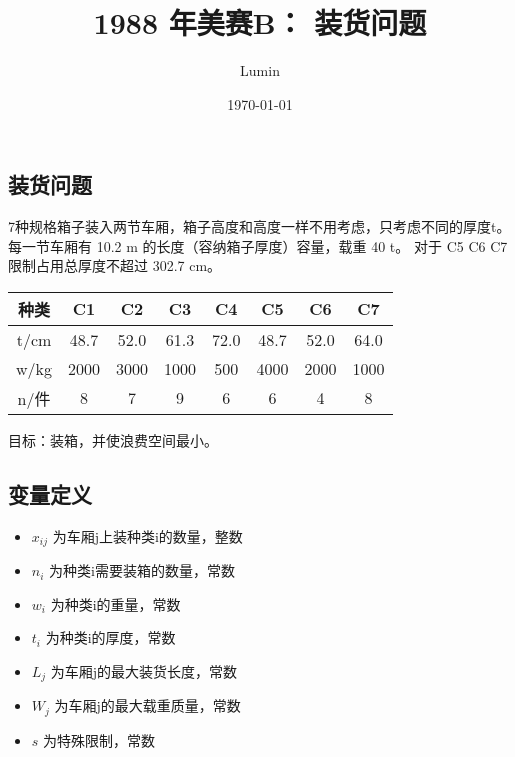 \documentclass[11pt,a4paper]{article}
\title{1988 年美赛B： 装货问题}
\author{Lumin}
\date{\today}
\begin{document}
\begin{CJK}{UTF8}{gkai}
\thispagestyle{empty}
\maketitle

\section{装货问题}
	7种规格箱子装入两节车厢，箱子高度和高度一样不用考虑，只考虑不同的厚度t。
	每一节车厢有 10.2 m 的长度（容纳箱子厚度）容量，载重 40 t。
	对于 C5 C6 C7 限制占用总厚度不超过 302.7 cm。\newline
	\begin{center}
	\begin{tabular}{|c|c|c|c|c|c|c|c|}
	种类 & C1 & C2 & C3 & C4 & C5 & C6 & C7 \\
	\hline
	t/cm & 48.7 & 52.0 & 61.3 & 72.0 & 48.7 & 52.0 & 64.0 \\
	w/kg & 2000 & 3000 & 1000 & 500  & 4000 & 2000 & 1000 \\
	n/件 & 8 & 7 & 9 & 6 & 6 & 4 & 8\\
	\end{tabular}
	\end{center}
	目标：装箱，并使浪费空间最小。

	\subsection{变量定义}
	\begin{multicols}{2}
	\begin{itemize}
	\item $x_{ij}$ 为车厢j上装种类i的数量，整数
	\item $n_i$ 为种类i需要装箱的数量，常数
	\item $w_i$ 为种类i的重量，常数
	\item $t_i$ 为种类i的厚度，常数
	\item $L_j$ 为车厢j的最大装货长度，常数
	\item $W_j$ 为车厢j的最大载重质量，常数
	\item $s$ 为特殊限制，常数
	\end{itemize}
	\end{multicols}


\end{CJK}
\end{document}
